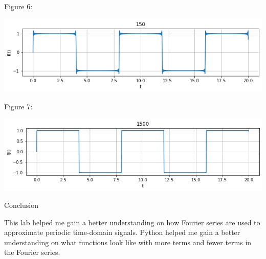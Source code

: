 \documentclass[nobib]{MSword}
\begin{document}
Figure 6:

\includegraphics[scale = 0.75]
{txt/Lab8Fig6.png}

Figure 7:

\includegraphics[scale = 0.75]
{txt/Lab8Fig7.png}


\begin{center}
    Conclusion
\end{center}
    This lab helped me gain a better understanding on how Fourier series are used to approximate periodic time-domain signals. Python helped me gain a better understanding on what functions look like with more terms and fewer terms in the Fourier series.
\end{document}
